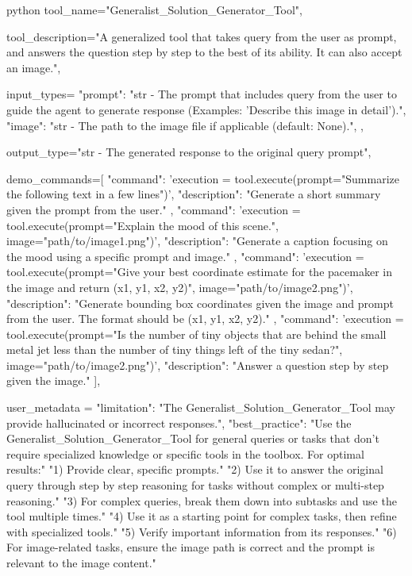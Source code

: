 \begin{codecolorbox}{python}
tool_name="Generalist_Solution_Generator_Tool",

tool_description="A generalized tool that takes query from the user as prompt, and answers the question step by step to the best of its ability. It can also accept an image.",

input_types={
    "prompt": "str - The prompt that includes query from the user to guide the agent to generate response (Examples: 'Describe this image in detail').",
    "image": "str - The path to the image file if applicable (default: None).",
},

output_type="str - The generated response to the original query prompt",

demo_commands=[
    {
        "command": 'execution = tool.execute(prompt="Summarize the following text in a few lines")',
        "description": "Generate a short summary given the prompt from the user."
    },
    {
        "command": 'execution = tool.execute(prompt="Explain the mood of this scene.", image="path/to/image1.png")',
        "description": "Generate a caption focusing on the mood using a specific prompt and image."
    },
    {
        "command": 'execution = tool.execute(prompt="Give your best coordinate estimate for the pacemaker in the image and return (x1, y1, x2, y2)", image="path/to/image2.png")',
        "description": "Generate bounding box coordinates given the image and prompt from the user. The format should be (x1, y1, x2, y2)."
    },
    {
        "command": 'execution = tool.execute(prompt="Is the number of tiny objects that are behind the small metal jet less than the number of tiny things left of the tiny sedan?", image="path/to/image2.png")',
        "description": "Answer a question step by step given the image."
    }
],

user_metadata = {
    "limitation": "The Generalist_Solution_Generator_Tool may provide hallucinated or incorrect responses.",
    "best_practice": "Use the Generalist_Solution_Generator_Tool for general queries or tasks that don't require specialized knowledge or specific tools in the toolbox. For optimal results:\n\n"
    "1) Provide clear, specific prompts.\n"
    "2) Use it to answer the original query through step by step reasoning for tasks without complex or multi-step reasoning.\n"
    "3) For complex queries, break them down into subtasks and use the tool multiple times.\n"
    "4) Use it as a starting point for complex tasks, then refine with specialized tools.\n"
    "5) Verify important information from its responses.\n"
    "6) For image-related tasks, ensure the image path is correct and the prompt is relevant to the image content."
}
\end{codecolorbox}


